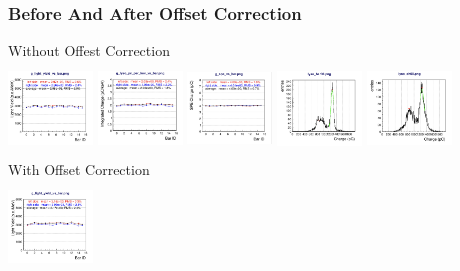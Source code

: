 \documentclass{beamer}
\begin{document}
\begin{frame}
    \frametitle{Before And After Offset Correction}
\centering
Without Offest Correction\\
\includegraphics[width=2.25cm, height=2.5cm]{../btl_files/WithoutOffset/Screenshot 2025-01-27 at 07.00.10.png}
\includegraphics[width=2.25cm, height=2.5cm]{../btl_files/WithoutOffset/Screenshot 2025-01-27 at 07.00.21.png}
\includegraphics[width=2.25cm, height=2.5cm]{../btl_files/WithoutOffset/Screenshot 2025-01-27 at 07.00.32.png}
\includegraphics[width=2.25cm, height=2.5cm]{../btl_files/WithoutOffset/Screenshot 2025-01-27 at 07.00.42.png}
\includegraphics[width=2.25cm, height=2.5cm]{../btl_files/WithoutOffset/Screenshot 2025-01-27 at 07.01.00.png}\\
With Offset Correction \\
\includegraphics[width=2.25cm, height=2.5cm]{../btl_files/WithOffSet/Screenshot 2025-01-27 at 06.56.53.png}

\end{frame}
\end{document}
